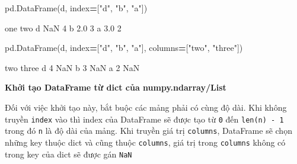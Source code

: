 \documentclass[
]{book}
\newenvironment{Shaded}{\begin{snugshade}}{\end{snugshade}}
\newcommand{\DecValTok}[1]{\textcolor[rgb]{0.00,0.00,0.81}{#1}}
\newcommand{\NormalTok}[1]{#1}
\newcommand{\OperatorTok}[1]{\textcolor[rgb]{0.81,0.36,0.00}{\textbf{#1}}}
\newcommand{\StringTok}[1]{\textcolor[rgb]{0.31,0.60,0.02}{#1}}
\begin{document}
\begin{Shaded}
\begin{Highlighting}[]
\NormalTok{pd.DataFrame(d, index}\OperatorTok{=}\NormalTok{[}\StringTok{"d"}\NormalTok{, }\StringTok{"b"}\NormalTok{, }\StringTok{"a"}\NormalTok{])}
\end{Highlighting}
\end{Shaded}

\begin{Shaded}
\begin{Highlighting}[]
\NormalTok{   one  two}
\NormalTok{d  NaN    4}
\NormalTok{b  2.0    3}
\NormalTok{a  3.0    2}
\end{Highlighting}
\end{Shaded}

\begin{Shaded}
\begin{Highlighting}[]
\NormalTok{pd.DataFrame(d, index}\OperatorTok{=}\NormalTok{[}\StringTok{"d"}\NormalTok{, }\StringTok{"b"}\NormalTok{, }\StringTok{"a"}\NormalTok{], columns}\OperatorTok{=}\NormalTok{[}\StringTok{"two"}\NormalTok{, }\StringTok{"three"}\NormalTok{])}
\end{Highlighting}
\end{Shaded}

\begin{Shaded}
\begin{Highlighting}[]
\NormalTok{   two  three}
\NormalTok{d    }\DecValTok{4}\NormalTok{    NaN}
\NormalTok{b    }\DecValTok{3}\NormalTok{    NaN}
\NormalTok{a    }\DecValTok{2}\NormalTok{    NaN}
\end{Highlighting}
\end{Shaded}

\textbf{Khởi tạo DataFrame từ dict của numpy.ndarray/List}

Đối với việc khởi tạo này, bắt buộc các mảng phải có cùng độ dài. Khi không truyền \texttt{index} vào thì
index của DataFrame sẽ được tạo từ \texttt{0} đến \texttt{len(n)\ -\ 1} trong đó \texttt{n} là độ dài của mảng. Khi truyền
giá trị \texttt{columns}, DataFrame sẽ chọn những key thuộc dict và cũng thuộc \texttt{columns}, giá trị trong
\texttt{columns} không có trong key của dict sẽ được gán \texttt{NaN}
\end{document}
